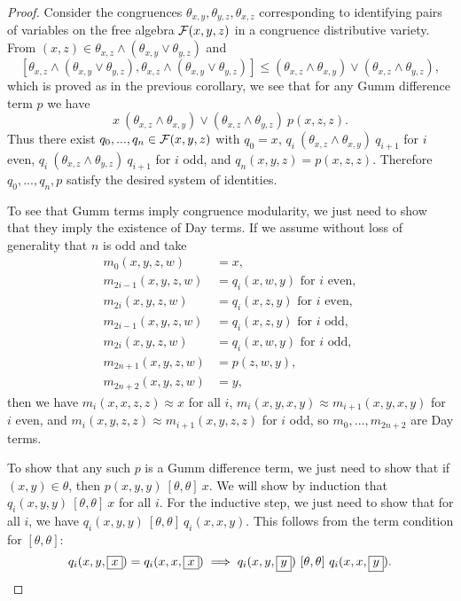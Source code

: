 \documentclass[letterpaper,11pt]{article}
\begin{document}
\begin{proof} Consider the congruences $\theta_{x,y}, \theta_{y,z}, \theta_{x,z}$ corresponding to identifying pairs of variables on the free algebra $\mathcal{F}(x,y,z)$ in a congruence distributive variety. From $(x,z) \in \theta_{x,z}\wedge (\theta_{x,y} \vee \theta_{y,z})$ and
\[
[\theta_{x,z}\wedge (\theta_{x,y} \vee \theta_{y,z}),\theta_{x,z}\wedge (\theta_{x,y} \vee \theta_{y,z})] \le (\theta_{x,z} \wedge \theta_{x,y}) \vee (\theta_{x,z} \wedge \theta_{y,z}),
\]
which is proved as in the previous corollary, we see that for any Gumm difference term $p$ we have
\[
x\ (\theta_{x,z} \wedge \theta_{x,y}) \vee (\theta_{x,z} \wedge \theta_{y,z})\ p(x,z,z).
\]
Thus there exist $q_0, ..., q_n \in \mathcal{F}(x,y,z)$ with $q_0 = x$, $q_i\ (\theta_{x,z} \wedge \theta_{x,y})\ q_{i+1}$ for $i$ even, $q_i\ (\theta_{x,z} \wedge \theta_{y,z})\ q_{i+1}$ for $i$ odd, and $q_n(x,y,z) = p(x,z,z)$. Therefore $q_0, ..., q_n, p$ satisfy the desired system of identities.

To see that Gumm terms imply congruence modularity, we just need to show that they imply the existence of Day terms. If we assume without loss of generality that $n$ is odd and take
\begin{align*}
m_0(x,y,z,w) &= x,\\
m_{2i-1}(x,y,z,w) &= q_i(x,w,y)\text{ for }i\text{ even},\\
m_{2i}(x,y,z,w) &= q_i(x,z,y)\text{ for }i\text{ even},\\
m_{2i-1}(x,y,z,w) &= q_i(x,z,y)\text{ for }i\text{ odd},\\
m_{2i}(x,y,z,w) &= q_i(x,w,y)\text{ for }i\text{ odd},\\
m_{2n+1}(x,y,z,w) &= p(z,w,y),\\
m_{2n+2}(x,y,z,w) &= y,
\end{align*}
then we have $m_i(x,x,z,z) \approx x$ for all $i$, $m_i(x,y,x,y) \approx m_{i+1}(x,y,x,y)$ for $i$ even, and $m_i(x,y,z,z) \approx m_{i+1}(x,y,z,z)$ for $i$ odd, so $m_0, ..., m_{2n+2}$ are Day terms.

To show that any such $p$ is a Gumm difference term, we just need to show that if $(x,y) \in \theta$, then $p(x,y,y)\ [\theta,\theta]\ x$. We will show by induction that $q_i(x,y,y)\ [\theta,\theta]\ x$ for all $i$. For the inductive step, we just need to show that for all $i$, we have $q_i(x,y,y)\ [\theta,\theta]\ q_i(x,x,y)$. This follows from the term condition for $[\theta,\theta]$:
\[
q_i(x,y,\boxed{x}) = q_i(x,x,\boxed{x}) \implies q_i(x,y,\boxed{y})\ [\theta,\theta]\ q_i(x,x,\boxed{y}).\qedhere
\]
\end{proof}
\end{document}
